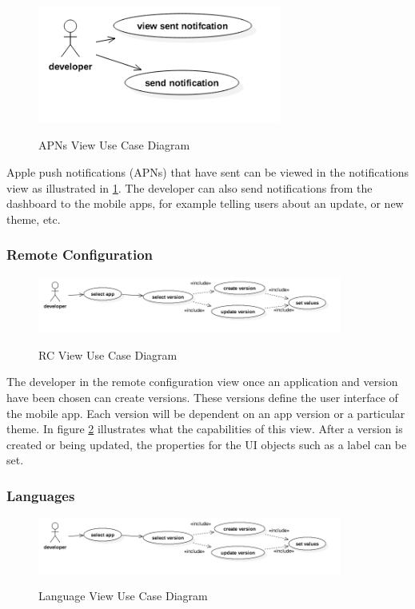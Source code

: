 \begin{figure}[!h] 
    \caption{APNs View Use Case Diagram}
    \centering
    \includegraphics[width=80mm]{images/use_cases/notifications_uc}
    \label{fig:notifications_uc}
\end{figure}

Apple push notifications (APNs) that have sent can be viewed in the notifications view as illustrated in \ref{fig:notifications_uc}. The developer can also send notifications from the dashboard to the mobile apps, for example telling users about an update, or new theme, etc. 

\subsubsection{Remote Configuration} \label{d-db:remote_config}

\begin{figure}[!h]
    \caption{RC View Use Case Diagram}
    \centering
    \includegraphics[width=100mm]{images/use_cases/rc_uc}
    \label{fig:rc_uc}
\end{figure}
 
The developer in the remote configuration view once an application and version have been chosen can create versions. These versions define the user interface of the mobile app. Each version will be dependent on an app version or a particular theme. In figure \ref{fig:rc_uc} illustrates what the capabilities of this view. After a version is created or being updated, the properties for the UI objects such as a label can be set.
 
\subsubsection{Languages} \label{d-db:languages}

\begin{figure}[!h]
    \caption{Language View Use Case Diagram}
    \centering
    \includegraphics[width=100mm]{images/use_cases/rc_uc}
    \label{fig:language_uc}
\end{figure}

